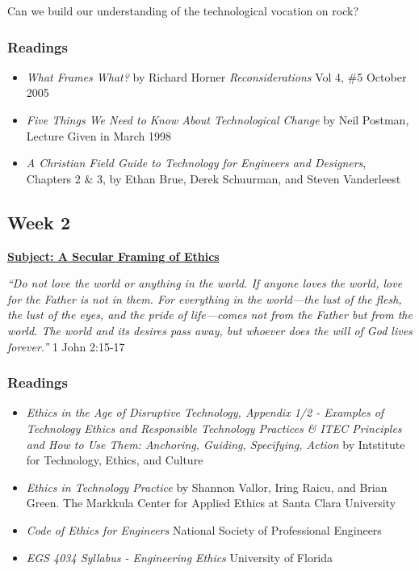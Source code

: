 \documentclass[11pt]{article}
\begin{document}
Can we build our understanding of the technological vocation on rock?
\subsubsection*{Readings}
\label{sec:org0ef7cfb}
\begin{itemize}
\item \emph{What Frames What?} by Richard Horner \emph{Reconsiderations} Vol 4, \#5 October
2005
\item \emph{Five Things We Need to Know About Technological Change} by Neil Postman,
Lecture Given in March 1998
\item \emph{A Christian Field Guide to Technology for Engineers and Designers}, Chapters
2 \& 3, by Ethan Brue, Derek Schuurman, and Steven Vanderleest
\end{itemize}
\subsection*{Week 2}
\label{sec:org362078f}
\textbf{\uline{Subject: A Secular Framing of Ethics}}
\begin{mdframed}[nobreak=true]
\emph{``Do not love the world or anything in the world. If anyone loves the world,
love for the Father is not in them. For everything in the world—the lust
of the flesh, the lust of the eyes, and the pride of life—comes not from the
Father but from the world. The world and its desires pass away, but whoever
does the will of God lives forever.''} 1 John 2:15-17
\end{mdframed}
\subsubsection*{Readings}
\label{sec:org56869be}
\begin{itemize}
\item \emph{Ethics in the Age of Disruptive Technology, Appendix 1/2 - Examples of
Technology Ethics and Responsible Technology Practices \& ITEC Principles and
How to Use Them: Anchoring, Guiding, Specifying, Action} by Intstitute for
Technology, Ethics, and Culture
\item \emph{Ethics in Technology Practice} by Shannon Vallor, Iring Raicu, and Brian
Green. The Markkula Center for Applied Ethics at Santa Clara University
\item \emph{Code of Ethics for Engineers} National Society of Professional Engineers
\item \emph{EGS 4034 Syllabus - Engineering Ethics} University of Florida
\end{itemize}
\end{document}
